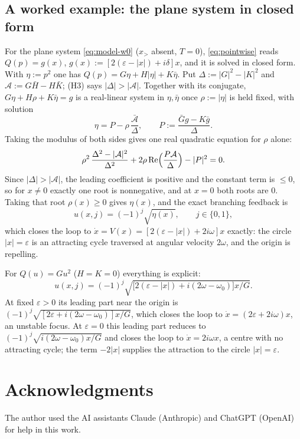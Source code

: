 \documentclass[11pt,reqno]{amsart}
\theoremstyle{plain}
\theoremstyle{definition}
\theoremstyle{remark}
\begin{document}
\subsection{A worked example: the plane system in closed form}\label{sec:h3-example}
For the plane system \eqref{eq:model-w0} ($x_>$ absent, $T=0$), \eqref{eq:pointwise} reads
$Q(p)=g(x)$, $g(x):=[2(\varepsilon-|x|)+i\delta]x$, and it is solved in closed form. With
$\eta:=p^{2}$ one has $Q(p)=G\eta+H|\eta|+K\bar\eta$. Put $\Delta:=|G|^{2}-|K|^{2}$ and
$\mathcal A:=G\bar H-H\bar K$; (H3) says $|\Delta|>|\mathcal A|$. Together with its conjugate,
$G\eta+H\rho+K\bar\eta=g$ is a real-linear system in $\eta,\bar\eta$ once $\rho:=|\eta|$ is held
fixed, with solution
\[
  \eta=P-\rho\,\frac{\bar{\mathcal A}}{\Delta},\qquad P:=\frac{\bar Gg-K\bar g}{\Delta}.
\]
Taking the modulus of both sides gives one real quadratic equation for $\rho$ alone:
\begin{equation}\label{eq:rho-quad}
  \rho^{2}\,\frac{\Delta^{2}-|\mathcal A|^{2}}{\Delta^{2}}+2\rho\,\mathrm{Re}\Bigl(\frac{P\mathcal A}\Delta\Bigr)-|P|^{2}=0.
\end{equation}
Since $|\Delta|>|\mathcal A|$, the leading coefficient is positive and the constant term is $\le0$, so
for $x\ne0$ exactly one root is nonnegative, and at $x=0$ both roots are $0$. Taking that root $\rho(x)\ge0$ gives
$\eta(x)$, and the exact branching feedback is
\begin{equation}\label{eq:branches}
  u(x,j)=(-1)^{j}\sqrt{\eta(x)},\qquad j\in\{0,1\},
\end{equation}
which closes the loop to $\dot x=V(x)=[2(\varepsilon-|x|)+2i\omega]x$ exactly: the circle
$|x|=\varepsilon$ is an attracting cycle traversed at angular velocity $2\omega$, and the origin is
repelling.

For $Q(u)=Gu^{2}$ ($H=K=0$) everything is explicit:
\[
  u(x,j)=(-1)^{j}\sqrt{\bigl[2(\varepsilon-|x|)+i(2\omega-\omega_0)\bigr]x/G}.
\]
At fixed $\varepsilon>0$ its leading part near the origin is
$(-1)^{j}\sqrt{[2\varepsilon+i(2\omega-\omega_0)]x/G}$, which closes the loop to
$\dot x=(2\varepsilon+2i\omega)x$, an unstable focus. At $\varepsilon=0$ this leading part reduces to
$(-1)^{j}\sqrt{i(2\omega-\omega_0)x/G}$ and closes the loop to $\dot x=2i\omega x$, a centre with no
attracting cycle; the term $-2|x|$ supplies the attraction to the circle $|x|=\varepsilon$.

\label{pg:append}
\section*{Acknowledgments}
The author used the AI assistants Claude (Anthropic) and ChatGPT (OpenAI) for help in this work.
\end{document}
